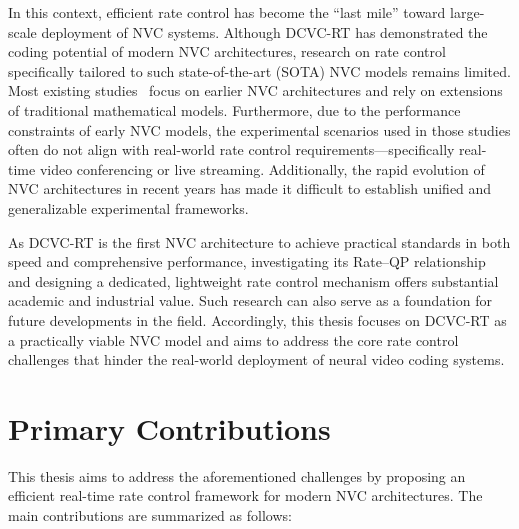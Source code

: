 In this context, efficient rate control has become the ``last mile'' toward large-scale deployment of NVC systems. Although DCVC-RT has demonstrated the coding potential of modern NVC architectures, research on rate control specifically tailored to such state-of-the-art (SOTA) NVC models remains limited. Most existing studies~\parencite{51, 52, 28} focus on earlier NVC architectures and rely on extensions of traditional mathematical models. Furthermore, due to the performance constraints of early NVC models, the experimental scenarios used in those studies often do not align with real-world rate control requirements—specifically real-time video conferencing or live streaming. Additionally, the rapid evolution of NVC architectures in recent years has made it difficult to establish unified and generalizable experimental frameworks.

As DCVC-RT is the first NVC architecture to achieve practical standards in both speed and comprehensive performance, investigating its Rate–QP relationship and designing a dedicated, lightweight rate control mechanism offers substantial academic and industrial value. Such research can also serve as a foundation for future developments in the field. Accordingly, this thesis focuses on DCVC-RT as a practically viable NVC model and aims to address the core rate control challenges that hinder the real-world deployment of neural video coding systems.

\section{Primary Contributions}
This thesis aims to address the aforementioned challenges by proposing an efficient real-time rate control framework for modern NVC architectures. The main contributions are summarized as follows:

